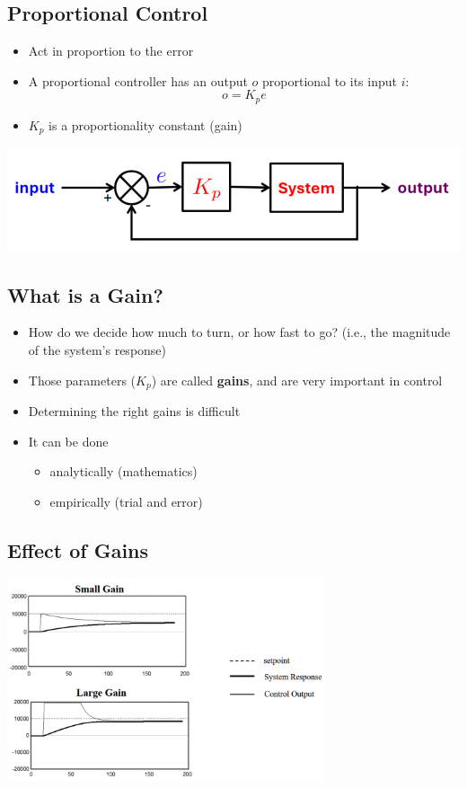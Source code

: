 \documentclass[10pt]{article}
\begin{document}
\subsection*{Proportional Control}
\begin{itemize}
	\item Act in proportion to the error
	\item A proportional controller has an output $o$ proportional to its input $i$:
	\[o = K_p e\]
    \item $K_p$ is a proportionality constant (gain)
\end{itemize}
\begin{center} 
	\includegraphics*[width=\textwidth]{L2_9.png}
\end{center}

\subsection*{What is a Gain?}
\begin{itemize}
	\item How do we decide how much to turn, or how fast to go?  (i.e., the magnitude of the system's response)
	\item Those parameters ($K_p$) are called \textbf{gains}, and are very important in control
	\item Determining the right gains is difficult
	\item It can be done
	\begin{itemize}
        \item analytically (mathematics)
        \item empirically (trial and error)
    \end{itemize}
\end{itemize}

\subsection*{Effect of Gains}
\begin{center} 
	\includegraphics*[width=0.7\textwidth]{L2_10.png} 
\end{center}
\end{document}
